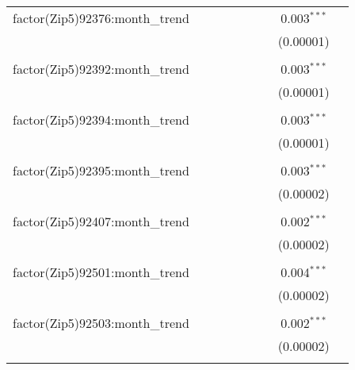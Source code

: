 \begin{table}[H]
{\begin{tabular}{@{\extracolsep{5pt}}lcccccccc}
  factor(Zip5)92376:month\_trend &  &  &  &  &  &  & 0.003$^{***}$ &  \\  

   &  &  &  &  &  &  & (0.00001) &  \\  

   & & & & & & & & \\  

  factor(Zip5)92392:month\_trend &  &  &  &  &  &  & 0.003$^{***}$ &  \\  

   &  &  &  &  &  &  & (0.00001) &  \\  

   & & & & & & & & \\  

  factor(Zip5)92394:month\_trend &  &  &  &  &  &  & 0.003$^{***}$ &  \\  

   &  &  &  &  &  &  & (0.00001) &  \\  

   & & & & & & & & \\  

  factor(Zip5)92395:month\_trend &  &  &  &  &  &  & 0.003$^{***}$ &  \\  

   &  &  &  &  &  &  & (0.00002) &  \\  

   & & & & & & & & \\  

  factor(Zip5)92407:month\_trend &  &  &  &  &  &  & 0.002$^{***}$ &  \\  

   &  &  &  &  &  &  & (0.00002) &  \\  

   & & & & & & & & \\  

  factor(Zip5)92501:month\_trend &  &  &  &  &  &  & 0.004$^{***}$ &  \\  

   &  &  &  &  &  &  & (0.00002) &  \\  

   & & & & & & & & \\  

  factor(Zip5)92503:month\_trend &  &  &  &  &  &  & 0.002$^{***}$ &  \\  

   &  &  &  &  &  &  & (0.00002) &  \\  

   & & & & & & & & \\  


\end{tabular}}
\end{table}
